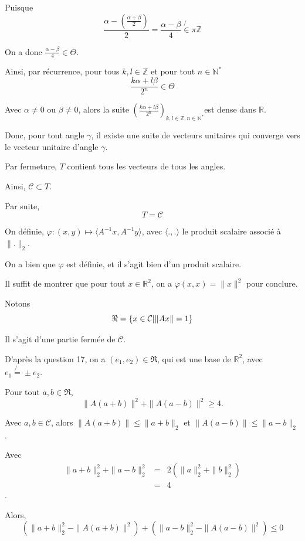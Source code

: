 Puisque
\[ \frac{\alpha - \left( \frac{\alpha + \beta}{2} \right)}{2} = \frac{\alpha -
   \beta}{4} \not{\in} \pi \mathbb{Z} \]


On a donc $\frac{\alpha - \beta}{4} \in \Theta$.

Ainsi, par r{\'e}currence, pour tous $k, l \in \mathbb{Z}$ et pour tout $n \in
\mathbb{N}^{\ast}$
\[ \frac{k \alpha + l \beta}{2^n} \in \Theta \]


Avec $\alpha \neq 0$ ou $\beta \neq 0$, alors la suite $\left( \frac{k \alpha
+ l \beta}{2^n} \right)_{k, l \in \mathbb{Z}, n \in \mathbb{N}^{\ast}}$est
dense dans $\mathbb{R}$.

Donc, pour tout angle $\gamma$, il existe une suite de vecteurs unitaires qui
converge vers le vecteur unitaire d'angle $\gamma$.

Par fermeture, $T$ contient tous les vecteurs de tous les angles.

Ainsi, $\mathcal{C} \subset T$.

Par suite,
\[ T =\mathcal{C} \]


 On d{\'e}finie, $\varphi : (x, y) \longmapsto \langle A^{- 1}
x, A^{- 1} y \rangle$, avec $\langle ., . \rangle$ le produit scalaire
associ{\'e} {\`a} $\| . \|_2$.

On a bien que $\varphi$ est d{\'e}finie, et il s'agit bien d'un produit
scalaire.

Il suffit de montrer que pour tout $x \in \mathbb{R}^2$, on a $\varphi (x, x)
= \| x \|^2$ pour conclure.

Notons
\[ \Re = \{ x \in \mathcal{C} |   \| A x \| = 1 \} \]


Il s'agit d'une partie ferm{\'e}e de $\mathcal{C}$.

D'apr{\`e}s la question 17, on a $(e_1, e_2) \in \Re$, qui est une base de
$\mathbb{R}^2$, avec $e_1 \not{=} \pm e_2$.

Pour tout $a, b \in \Re$,
\[ \| A (a + b) \|^2 + \| A (a - b) \|^2 \geqslant 4. \]


Avec $a, b \in \mathcal{C}$, alors $\| A (a + b) \|  \leqslant \| a + b \|_2$
et $\| A (a - b) \|  \leqslant \| a - b \|_2$.

Avec
\begin{eqnarray*}
  \| a + b \|^2_2 + \| a - b \|^2_2 & = & 2 (\| a \|^2_2 + \| b \|^2_2)\\
  & = & 4
\end{eqnarray*}
.

Alors,
\[ (\| a + b \|_2^2 - \| A (a + b) \|^2) + (\| a - b \|_2^2 - \| A (a - b)
   \|^2) \leqslant 0 \]


